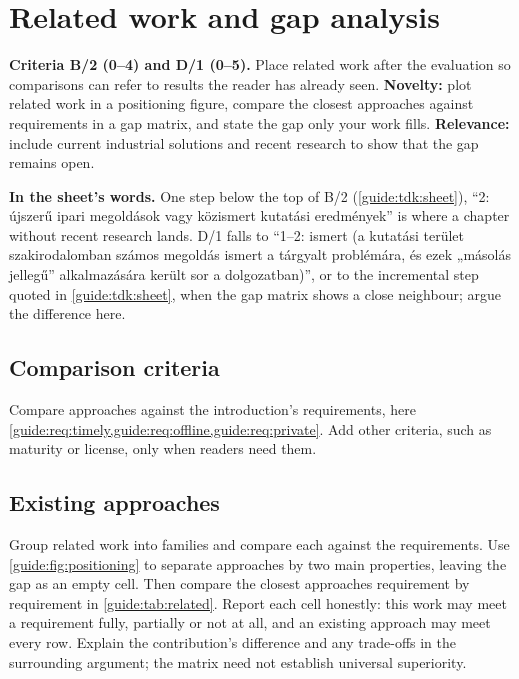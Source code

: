 \section{Related work and gap analysis}\label{guide:chapters:related}
\textbf{Criteria B/2 (0--4) and D/1 (0--5).} Place related work after the evaluation so comparisons can refer to results the reader has already seen.
\textbf{Novelty:} plot related work in a positioning figure, compare the closest approaches against requirements in a gap matrix, and state the gap only your work fills.
\textbf{Relevance:} include current industrial solutions and recent research to show that the gap remains open.

\textbf{In the sheet's words.} One step below the top of B/2 (\cref{guide:tdk:sheet}), \enquote{2: újszerű ipari megoldások vagy közismert kutatási eredmények} is where a chapter without recent research lands. D/1 falls to \enquote{1--2: ismert (a kutatási terület szakirodalomban számos megoldás ismert a tárgyalt problémára, és ezek „másolás jellegű” alkalmazására került sor a dolgozatban)}, or to the incremental step quoted in \cref{guide:tdk:sheet}, when the gap matrix shows a close neighbour; argue the difference here.

\subsection{Comparison criteria}\label{guide:chapters:comparison-criteria}
Compare approaches against the introduction's requirements, here \cref{guide:req:timely,guide:req:offline,guide:req:private}. Add other criteria, such as maturity or license, only when readers need them.

\subsection[Existing approaches]{Existing approaches\skimmark}\label{guide:chapters:existing-approaches}
Group related work into families and compare each against the requirements. Use \cref{guide:fig:positioning} to separate approaches by two main properties, leaving the gap as an empty cell. Then compare the closest approaches requirement by requirement in \cref{guide:tab:related}. Report each cell honestly: this work may meet a requirement fully, partially or not at all, and an existing approach may meet every row. Explain the contribution's difference and any trade-offs in the surrounding argument; the matrix need not establish universal superiority.

